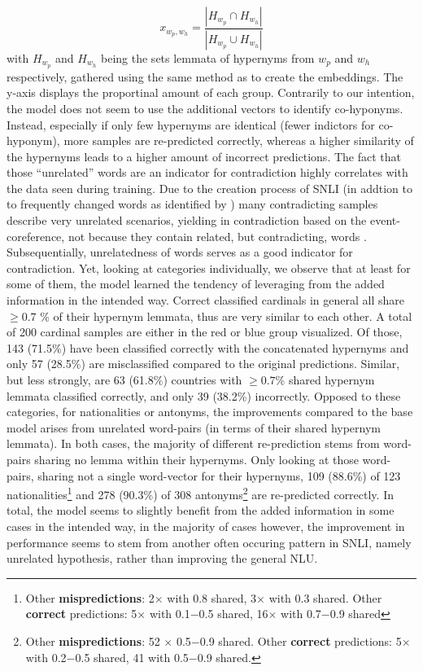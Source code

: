 \begin{equation}
x_{w_p,w_h} = \frac{|H_{w_p} \cap H_{w_h}|}{|H_{w_p} \cup H_{w_h}|}
\end{equation}
with $H_{w_p}$ and $H_{w_h}$ being the sets lemmata of hypernyms from $w_p$ and $w_h$ respectively, gathered using the same method as to create the embeddings. The y-axis displays the proportinal amount of each group. Contrarily to our intention, the model does not seem to use the additional vectors to identify co-hyponyms. Instead, especially if only few hypernyms are identical (fewer indictors for co-hyponym), more samples are re-predicted correctly, whereas a higher similarity of the hypernyms leads to a higher amount of incorrect predictions. The fact that those ``unrelated'' words are an indicator for contradiction highly correlates with the data seen during training. Due to the creation process of \ac{SNLI} (in addtion to to frequently changed words as identified by \cite{gururangan2018annotation}) many contradicting samples describe very unrelated scenarios, yielding in contradiction based on the event-coreference, not because they contain related, but contradicting, words \citep{dasgupta2018evaluating}. Subsequentially, unrelatedness of words serves as a good indicator for contradiction. Yet, looking at categories individually, we observe that at least for some of them, the model learned the tendency of leveraging from the added information in the intended way. Correct classified cardinals in general all share $\geq 0.7$ \% of their hypernym lemmata, thus are very similar to each other. A total of 200 cardinal samples are either in the red or blue group visualized. Of those, 143 (71.5\%) have been classified correctly with the concatenated hypernyms and only 57 (28.5\%) are misclassified compared to the original predictions. Similar, but less strongly, are 63 (61.8\%) countries with $\geq 0.7$\% shared hypernym lemmata classified correctly, and only 39 (38.2\%) incorrectly. Opposed to these categories, for nationalities or antonyms, the improvements compared to the base model arises from unrelated word-pairs (in terms of their shared hypernym lemmata). In both cases, the majority of different re-prediction stems from word-pairs sharing no lemma within their hypernyms. Only looking at those word-pairs, sharing not a single word-vector for their hypernyms, 109 (88.6\%) of 123 nationalities\footnote{Other \textbf{mispredictions}: 2$\times$ with 0.8 shared, 3$\times$ with 0.3 shared. Other \textbf{correct} predictions: 5$\times$ with 0.1$-$0.5 shared, 16$\times$ with 0.7$-$0.9 shared} and 278 (90.3\%) of 308 antonyms\footnote{Other \textbf{mispredictions}: 52 $\times$ 0.5$-$0.9 shared. Other \textbf{correct} predictions: 5$\times$ with 0.2$-$0.5 shared, 41 with 0.5$-$0.9 shared.} are re-predicted correctly. In total, the model seems to slightly benefit from the added information in some cases in the intended way, in the majority of cases however, the improvement in performance seems to stem from another often occuring pattern in \ac{SNLI}, namely unrelated hypothesis, rather than improving the general \ac{NLU}. 

